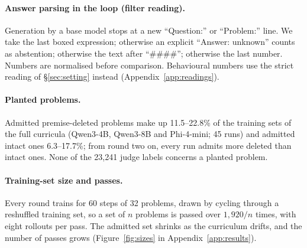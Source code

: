 \paragraph{Answer parsing in the loop (filter reading).} Generation by a base model stops at a new ``Question:'' or ``Problem:'' line. We take the last boxed expression; otherwise an explicit ``Answer: unknown'' counts as abstention; otherwise the text after ``\#\#\#\#''; otherwise the last number. Numbers are normalised before comparison. Behavioural numbers use the strict reading of \S\ref{sec:setting} instead (Appendix~\ref{app:readings}).

\paragraph{Planted problems.} Admitted premise-deleted problems make up 11.5--22.8\% of the training sets of the full curricula (Qwen3-4B, Qwen3-8B and Phi-4-mini; 45 runs) and admitted intact ones 6.3--17.7\%; from round two on, every run admits more deleted than intact ones. None of the 23,241 judge labels concerns a planted problem.

\paragraph{Training-set size and passes.} Every round trains for 60 steps of 32 problems, drawn by cycling through a reshuffled training set, so a set of $n$ problems is passed over $1{,}920/n$ times, with eight rollouts per pass. The admitted set shrinks as the curriculum drifts, and the number of passes grows (Figure~\ref{fig:sizes} in Appendix~\ref{app:results}).

